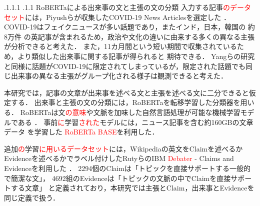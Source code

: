 \documentclass[a4paper, twocolumn, 10pt]{jarticle}
\makeatletter
\def\subsection{%
	\@startsection{subsection}{1}{\z@}%
	{.1\Cvs \@plus.1\Cdp \@minus.1\Cdp}%
	{.1\Cvs \@plus.1\Cdp}%
	{\normalfont\normalsize\bfseries}%
}
\makeatother
\begin{document}
\subsection{RoBERTaによる出来事の文と主張の文の分類}
入力する記事\textcolor{red}{のデータセット}には，Piyushらが収集したCOVID-19 News Articlesを選定した
．
COVID-19はフェイクニュースが多い話題であり，またインド，日本，韓国の
約8万件
の英記事が含まれるため，政治や文化の違いに由来する多くの異なる主張が分析できると考えた．
また，11カ月間という短い期間で収集されているため，より類似した出来事に関する記事が得られると
期待できる．
Yangらの研究と同様に話題がCOVID-19に限定されてしまっているが，限定された話題でも同じ出来事の異なる主張がグループ化される様子は観測できると考えた．

本研究では，記事の文章が出来事を述べる文と主張を述べる文に二分できると仮定する．
出来事と主張の文の分類には，RoBERTaを転移学習した分類器を用いる．
RoBERTaは文\textcolor{red}{の意味}や文脈を加味した自然言語処理が可能な機械学習モデルである
．
事前\textcolor{red}{に}学習\textcolor{red}{された}モデルには，ニュース記事を含む約160GBの文章データ
を学習した
\textcolor{red}{RoBERTa BASE}を利用した．

追加\textcolor{red}{の}学習\textcolor{red}{に用いるデータセット}には，Wikipediaの英文をClaimを述べるかEvidenceを述べるかでラベル付けしたRutyらのIBM \textcolor{red}{Debater} - Claims and Evidenceを利用した
．
2294個のClaimは「トピックを直接サポートする一般的で簡潔な文」，
4692組のEvidenceは「トピックの文脈の中でClaimを直接サポートする文章」
と定義されており，本研究では主張とClaim，出来事とEvidenceを同じ定義で扱う．
\end{document}
